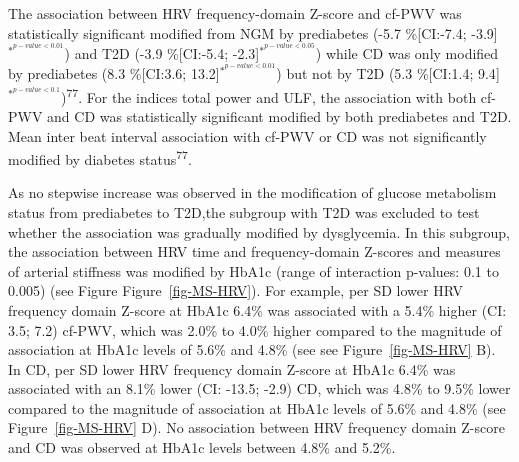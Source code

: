 \documentclass[
  a4paper,
  headsepline=true,
  open=any]{scrbook}
\begin{document}
The association between HRV frequency-domain Z-score and cf-PWV was
statistically significant modified from NGM by prediabetes (-5.7
\%{[}CI:-7.4; -3.9{]}\(^{*^{p-value< 0.01}}\)) and T2D (-3.9
\%{[}CI:-5.4; -2.3{]}\(^{*^{p-value< 0.05}}\)) while CD was only
modified by prediabetes (8.3 \%{[}CI:3.6;
13.2{]}\(^{*^{p-value< 0.01}}\)) but not by T2D (5.3 \%{[}CI:1.4;
9.4{]}\(^{*^{p-value< 0.1}}\))\textsuperscript{77}. For the indices
total power and ULF, the association with both cf-PWV and CD was
statistically significant modified by both prediabetes and T2D. Mean
inter beat interval association with cf-PWV or CD was not significantly
modified by diabetes status\textsuperscript{77}.

As no stepwise increase was observed in the modification of glucose
metabolism status from prediabetes to T2D,the subgroup with T2D was
excluded to test whether the association was gradually modified by
dysglycemia. In this subgroup, the association between HRV time and
frequency-domain Z-scores and measures of arterial stiffness was
modified by HbA1c (range of interaction p-values: 0.1 to 0.005) (see
Figure Figure~\ref{fig-MS-HRV}). For example, per SD lower HRV frequency
domain Z-score at HbA1c 6.4\% was associated with a 5.4\% higher (CI:
3.5; 7.2) cf-PWV, which was 2.0\% to 4.0\% higher compared to the
magnitude of association at HbA1c levels of 5.6\% and 4.8\% (see see
Figure~\ref{fig-MS-HRV} B). In CD, per SD lower HRV frequency domain
Z-score at HbA1c 6.4\% was associated with an 8.1\% lower (CI: -13.5;
-2.9) CD, which was 4.8\% to 9.5\% lower compared to the magnitude of
association at HbA1c levels of 5.6\% and 4.8\% (see
Figure~\ref{fig-MS-HRV} D). No association between HRV frequency domain
Z-score and CD was observed at HbA1c levels between 4.8\% and 5.2\%.

\end{document}
